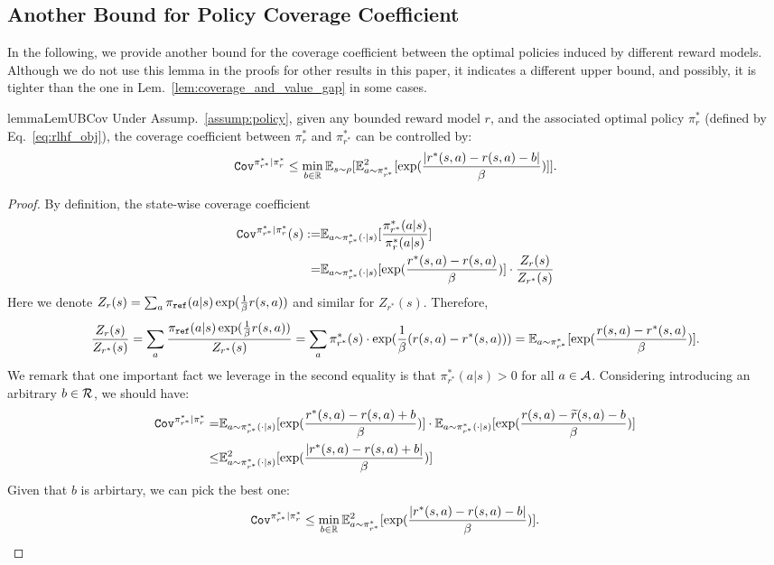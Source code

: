 \subsection{Another Bound for Policy Coverage Coefficient}
In the following, we provide another bound for the coverage coefficient between the optimal policies induced by different reward models.
Although we do not use this lemma in the proofs for other results in this paper, it indicates a different upper bound, and possibly, it is tighter than the one in Lem.~\ref{lem:coverage_and_value_gap} in some cases.
\begin{restatable}{lemma}{LemUBCov}\label{lem:UB_Cov}
    Under Assump.~\ref{assump:policy}, given any bounded reward model $r$, and the associated optimal policy $\pi^*_r$ (defined by Eq.~\eqref{eq:rlhf_obj}), the coverage coefficient between $\pi^*_r$ and $\pi^*_{r^*}$ can be controlled by:
    \begin{align*}
        {\texttt{Cov}}^{\pi^*_{r^*}|\pi^*_r} \leq \min_{b\in{\mathbb{R}}}\mathbb{E}_{s\sim\rho}[\mathbb{E}^2_{a\sim\pi^*_{r^*}}[\exp(\frac{|r^*(s,a) - r(s,a)-b|}{\beta})]].
    \end{align*}
\end{restatable}
\begin{proof}
    By definition, the state-wise coverage coefficient
    \begin{align*}
        {\texttt{Cov}}^{\pi^*_{r^*}|\pi^*_{r}}(s) :=& \mathbb{E}_{a\sim \pi^*_{r^*}(\cdot|s)}[\frac{\pi^*_{r^*}(a|s)}{\pi^*_{r}(a|s)}] \\
        =&\mathbb{E}_{a\sim \pi^*_{r^*}(\cdot|s)}[\exp(\frac{r^*(s,a) - r(s,a)}{\beta})] \cdot \frac{Z_{r}(s)}{Z_{r^*}(s)}
    \end{align*}
    Here we denote $Z_r(s) = \sum_{a} \pi_{\texttt{ref}}(a|s) \exp(\frac{1}{\beta} r(s,a))$ and similar for $Z_{r^*}(s)$. Therefore,
    \begin{align*}
        \frac{Z_{r}(s)}{Z_{r^*}(s)} = \sum_{a} \frac{\pi_{\texttt{ref}}(a|s)\exp(\frac{1}{\beta} r(s,a))}{Z_{r^*}(s)} = \sum_{a} \pi^*_{r^*}(s) \cdot \exp(\frac{1}{\beta}({r}(s,a) - r^*(s,a))) = \mathbb{E}_{a\sim \pi^*_{r^*}}[\exp(\frac{r(s,a) - r^*(s,a)}{\beta})].
    \end{align*}
    We remark that one important fact we leverage in the second equality is that $\pi^*_{r^*}(a|s) > 0$ for all $a\in\mathcal{A}$.
    Considering introducing an arbitrary $b \in \mathcal{R}$, we should have:
    \begin{align*}
        {\texttt{Cov}}^{\pi^*_{r^*}|\pi^*_{r}} =& \mathbb{E}_{a\sim \pi^*_{r^*}(\cdot|s)}[\exp(\frac{r^*(s,a) - {r}(s,a) + b}{\beta})] \cdot \mathbb{E}_{a\sim \pi^*_{r^*}(\cdot|s)}[\exp(\frac{{r}(s,a) - \widetilde  r(s,a) - b}{\beta})]\\
        \leq & \mathbb{E}_{a\sim \pi^*_{r^*}(\cdot|s)}^2[\exp(\frac{|r^*(s,a) - r(s,a) + b|}{\beta})]
    \end{align*}
    Given that $b$ is arbirtary, we can pick the best one:
    \begin{align*}
        {\texttt{Cov}}^{\pi^*_{r^*}|\pi^*_{r}} \leq \min_{b\in{\mathbb{R}}}\mathbb{E}^2_{a\sim\pi^*_{r^*}}[\exp(\frac{|r^*(s,a) - {r}(s,a)-b|}{\beta})].
    \end{align*}
\end{proof}


